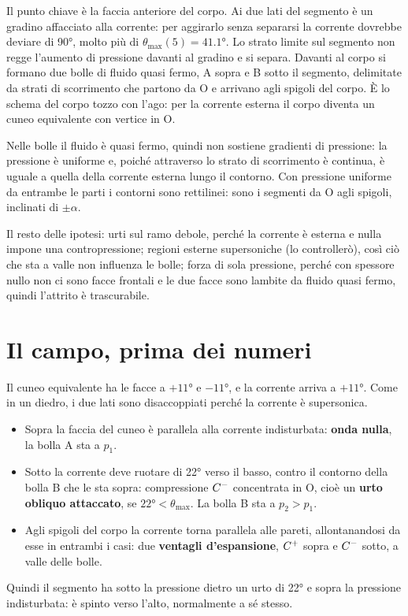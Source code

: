 Il punto chiave è la faccia anteriore del corpo. Ai due lati del segmento è un gradino affacciato alla corrente: per
aggirarlo senza separarsi la corrente dovrebbe deviare di \ang{90}, molto più di $\theta_{\max}(5)=\ang{41.1}$. Lo
strato limite sul segmento non regge l'aumento di pressione davanti al gradino e si separa. Davanti al corpo si
formano due bolle di fluido quasi fermo, A sopra e B sotto il segmento, delimitate da strati di scorrimento che
partono da O e arrivano agli spigoli del corpo. È lo schema del corpo tozzo con l'ago: per la corrente esterna il
corpo diventa un cuneo equivalente con vertice in O.

Nelle bolle il fluido è quasi fermo, quindi non sostiene gradienti di pressione: la pressione è uniforme e, poiché
attraverso lo strato di scorrimento è continua, è uguale a quella della corrente esterna lungo il contorno. Con
pressione uniforme da entrambe le parti i contorni sono rettilinei: sono i segmenti da O agli spigoli, inclinati di
$\pm\alpha$.

Il resto delle ipotesi: urti sul ramo debole, perché la corrente è esterna e nulla impone una contropressione;
regioni esterne supersoniche (lo controllerò), così ciò che sta a valle non influenza le bolle; forza di sola
pressione, perché con spessore nullo non ci sono facce frontali e le due facce sono lambite da fluido quasi fermo,
quindi l'attrito è trascurabile.

\section*{Il campo, prima dei numeri}
Il cuneo equivalente ha le facce a $+\ang{11}$ e $-\ang{11}$, e la corrente arriva a $+\ang{11}$. Come in un diedro, i
due lati sono disaccoppiati perché la corrente è supersonica.
\begin{itemize}
\item Sopra la faccia del cuneo è parallela alla corrente indisturbata: \textbf{onda nulla}, la bolla A sta a $p_1$.
\item Sotto la corrente deve ruotare di \ang{22} verso il basso, contro il contorno della bolla B che le sta sopra:
  compressione $C^{-}$ concentrata in O, cioè un \textbf{urto obliquo attaccato}, se $\ang{22}<\theta_{\max}$. La bolla
  B sta a $p_2>p_1$.
\item Agli spigoli del corpo la corrente torna parallela alle pareti, allontanandosi da esse in entrambi i casi: due
  \textbf{ventagli d'espansione}, $C^{+}$ sopra e $C^{-}$ sotto, a valle delle bolle.
\end{itemize}
Quindi il segmento ha sotto la pressione dietro un urto di \ang{22} e sopra la pressione indisturbata: è spinto
verso l'alto, normalmente a sé stesso.

